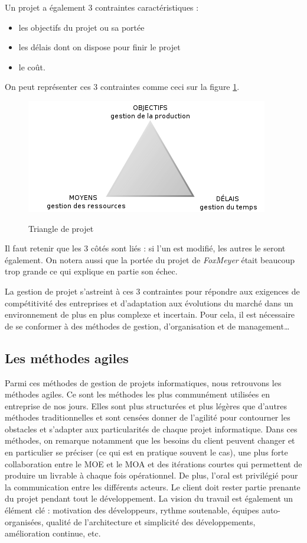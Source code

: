 \documentclass[12pt]{report}
\begin{document}
Un projet a également 3 contraintes caractéristiques :
\begin{itemize}
\item les objectifs du projet ou sa portée
\item les délais dont on dispose pour finir le projet
\item le coût\cite{wikigestion}.
\end{itemize}

On peut représenter ces 3 contraintes comme ceci sur la figure \ref{fig:trg}.
\begin{figure}[htp]
  \centering
  \includegraphics[scale=0.8]{images/triangle_projet}\cite{wikiprojet}
  \caption{Triangle de projet}
  \label{fig:trg}
\end{figure}

Il faut retenir que les 3 côtés sont liés : si l'un est modifié, les autres le seront également. On notera aussi que la portée du projet de \textit{FoxMeyer} était beaucoup trop grande ce qui explique en partie son échec.

La gestion de projet s’astreint à ces 3 contraintes pour répondre aux exigences de compétitivité des entreprises et d’adaptation aux évolutions du marché dans un environnement de plus en plus complexe et incertain\cite{coursiut}. Pour cela, il est nécessaire de se conformer à des méthodes de gestion, d'organisation et de management…

\subsection{Les méthodes agiles}

Parmi ces méthodes de gestion de projets informatiques, nous retrouvons les méthodes agiles. Ce sont les méthodes les plus communément utilisées en entreprise de nos jours\cite{coursiut}.
Elles sont plus structurées et plus légères que d'autres méthodes traditionnelles et sont censées donner de l'agilité pour contourner les obstacles et s'adapter aux particularités de chaque projet informatique.
Dans ces méthodes, on remarque notamment que les besoins du client peuvent changer et en particulier se préciser (ce qui est en pratique souvent le cas), une plus forte collaboration entre le MOE et le MOA et des itérations courtes qui permettent de produire un livrable à chaque fois opérationnel\cite{wikiscrum}. De plus, l'oral  est privilégié pour la communication entre les différents acteurs\cite{coursiut}. Le client doit rester partie prenante du projet pendant tout le développement.
La vision du travail est également un élément clé : motivation des développeurs, rythme soutenable, équipes auto-organisées, qualité de l'architecture et simplicité des développements, amélioration continue, etc.
\end{document}
